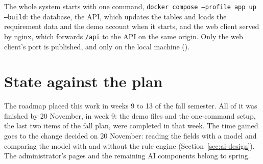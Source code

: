 The whole system starts with one command, \texttt{docker compose --profile app up --build}: the
database, the API, which updates the tables and loads the requirement data and the demo account
when it starts, and the web client served by nginx, which forwards \texttt{/api} to the API on
the same origin. Only the web client's port is published, and only on the local machine
().

\section{State against the plan}
The roadmap placed this work in weeks 9 to 13 of the fall semester. All of it was finished by
20 November, in week 9: the demo files and the one-command setup, the last two items of the fall
plan, were completed in that week. The time gained goes to the change decided on 20 November:
reading the fields with a model and comparing the model with and without the rule engine
(Section~\ref{sec:ai-design}). The administrator's pages and the remaining AI components belong
to spring.

